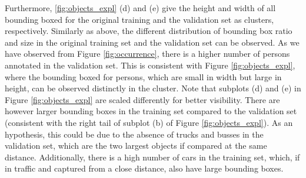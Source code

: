 \documentclass{article}
\begin{document}
Furthermore, \ref{fig:objects_expl} (d) and (e) give the height and width of all bounding boxed for the original training and the validation set as clusters, respectively. Similarly as above, the different distribution of bounding box ratio and size in the original training set and the validation set can be observed. As we have observed from Figure \ref{fig:occurrence}, there is a higher number of persons annotated in the validation set. This is consistent with Figure \ref{fig:objects_expl}, where the bounding boxed for persons, which are small in width but large in height, can be observed distinctly in the cluster. Note that subplots (d) and (e) in Figure \ref{fig:objects_expl} are scaled differently for better visibility. There are however larger bounding boxes in the training set compared to the validation set (consistent with the right tail of subplot (b) of Figure \ref{fig:objects_expl}). As an hypothesis, this could be due to the absence of trucks and busses in the validation set, which are the two largest objects if compared at the same distance. Additionally, there is a high number of cars in the training set, which, if in traffic and captured from a close distance, also have large bounding boxes.
\end{document}
